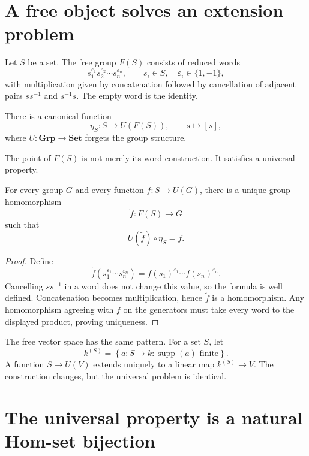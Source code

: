 
\section{A free object solves an extension problem}

Let \(S\) be a set.  The free group \(F(S)\) consists of reduced words
\[
  s_1^{\varepsilon_1}s_2^{\varepsilon_2}\cdots s_n^{\varepsilon_n},
  \qquad
  s_i\in S,
  \quad
  \varepsilon_i\in\{1,-1\},
\]
with multiplication given by concatenation followed by cancellation of adjacent pairs \(ss^{-1}\) and \(s^{-1}s\).  The empty word is the identity.

There is a canonical function
\[
  \eta_S:S\to U(F(S)),
  \qquad
  s\longmapsto [s],
\]
where \(U:\mathbf{Grp}\to\mathbf{Set}\) forgets the group structure.

The point of \(F(S)\) is not merely its word construction.  It satisfies a universal property.

\begin{theorem}
For every group \(G\) and every function \(f:S\to U(G)\), there is a unique group homomorphism
\[
  \widetilde f:F(S)\to G
\]
such that
\[
  U(\widetilde f)\circ\eta_S=f.
\]
\end{theorem}

\begin{proof}
Define
\[
  \widetilde f
  \left(s_1^{\varepsilon_1}\cdots s_n^{\varepsilon_n}\right)
  =f(s_1)^{\varepsilon_1}\cdots f(s_n)^{\varepsilon_n}.
\]
Cancelling \(ss^{-1}\) in a word does not change this value, so the formula is well defined.  Concatenation becomes multiplication, hence \(\widetilde f\) is a homomorphism.  Any homomorphism agreeing with \(f\) on the generators must take every word to the displayed product, proving uniqueness.
\end{proof}

The free vector space has the same pattern.  For a set \(S\), let
\[
  k^{(S)}=
  \left\{a:S\to k:\operatorname{supp}(a)\text{ finite}\right\}.
\]
A function \(S\to U(V)\) extends uniquely to a linear map \(k^{(S)}\to V\).  The construction changes, but the universal problem is identical.

\section{The universal property is a natural Hom-set bijection}

